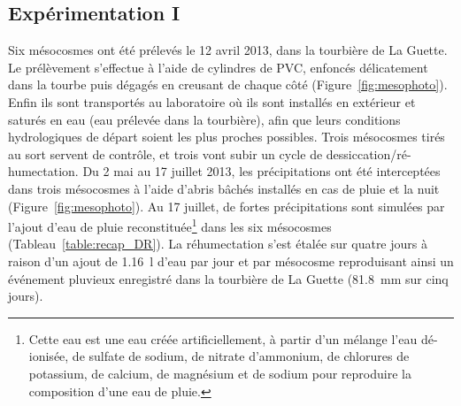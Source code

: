 \subsection{Expérimentation I}
Six mésocosmes ont été prélevés le 12 avril 2013, dans la tourbière de La Guette.
Le prélèvement s'effectue à l'aide de cylindres de PVC, enfoncés délicatement dans la tourbe puis dégagés en creusant de chaque côté (Figure~\ref{fig:mesophoto}).
Enfin ils sont transportés au laboratoire où ils sont installés en extérieur et saturés en eau (eau prélevée dans la tourbière), afin que leurs conditions hydrologiques de départ soient les plus proches possibles.
Trois mésocosmes tirés au sort servent de contrôle, et trois vont subir un cycle de dessiccation/ré-humectation.
Du 2 mai au 17 juillet 2013, les précipitations ont été interceptées dans trois mésocosmes à l'aide d'abris bâchés installés en cas de pluie et la nuit (Figure~\ref{fig:mesophoto}).
Au 17 juillet, de fortes précipitations sont simulées par l'ajout d'eau de pluie reconstituée\footnote{Cette eau est une eau créée artificiellement, à partir d'un mélange l'eau dé-ionisée, de sulfate de sodium, de nitrate d'ammonium, de chlorures de potassium, de calcium, de magnésium et de sodium pour reproduire la composition d'une eau de pluie.} dans les six mésocosmes (Tableau~\ref{table:recap_DR}).
La réhumectation s'est étalée sur quatre jours à raison d'un ajout de \SI{1.16}{\litre} d'eau par jour et par mésocosme reproduisant ainsi un événement pluvieux enregistré dans la tourbière de La Guette (\SI{81.8}{\milli\metre} sur cinq jours).

